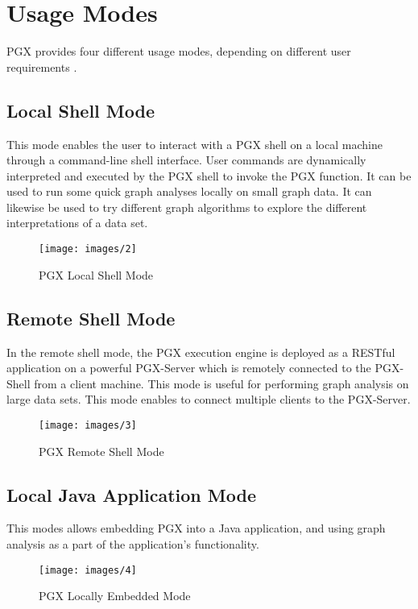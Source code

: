 \documentclass[9pt,twocolumn,twoside]{../../styles/osajnl}
\begin{document}
 


\section{Usage Modes}
PGX provides four different usage modes, depending on different user requirements \cite{www-usage}.

\subsection{Local Shell Mode}
This mode enables the user to interact with a PGX shell on a local machine through a command-line shell interface. User commands are dynamically interpreted and executed by the PGX shell to invoke the PGX function. It can be used to run some quick graph analyses locally on small graph data. It can likewise be used to try different graph algorithms to explore the different interpretations of a data set.
    \begin{figure}[h]
    \centering
    \texttt{[image: images/2]}
    \centering
    \caption{PGX Local Shell Mode \cite{www-usage}}
    \end{figure}
    
\subsection{Remote Shell Mode}
In the remote shell mode, the PGX execution engine is deployed as a RESTful application on a powerful PGX-Server which is remotely connected to the PGX-Shell from a client machine. This mode is useful for performing graph analysis on large data sets. This mode enables to connect multiple clients to the PGX-Server.
    \begin{figure}[h]
    \centering
    \texttt{[image: images/3]}
    \centering
    \caption{PGX Remote Shell Mode \cite{www-usage}}
    \end{figure}
    
\subsection{Local Java Application Mode}
This modes allows embedding PGX into a Java application, and using graph analysis as a part of the application’s functionality.
    \begin{figure}[h]
    \centering
    \texttt{[image: images/4]}
    \centering
    \caption{PGX Locally Embedded Mode \cite{www-usage}}
    \end{figure}
    
\end{document}
